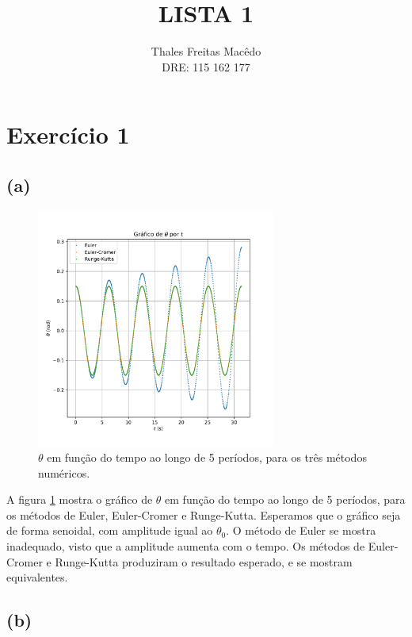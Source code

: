 \documentclass[a4paper, brazil]{article}
\author{Thales Freitas Macêdo \\ DRE: 115 162 177}
\title{LISTA 1}
\begin{document}
\maketitle

\section{Exercício 1}

\subsection{(a)}

\begin{figure}[ht]
\centering
\includegraphics[width=0.7\textwidth]{fig1a.pdf}
\caption{\( \theta \) em função do tempo ao longo de 5 períodos, para os três métodos numéricos.}
\label{fig1a}
\end{figure}

A figura \ref{fig1a} mostra o gráfico de \( \theta \) em função do tempo ao longo de 5 períodos, para os métodos de Euler, Euler-Cromer e Runge-Kutta.
Esperamos que o gráfico seja de forma senoidal, com amplitude igual ao \( \theta_0 \).
O método de Euler se mostra inadequado, visto que a amplitude aumenta com o tempo.
Os métodos de Euler-Cromer e Runge-Kutta produziram o resultado esperado, e se mostram equivalentes.

\newpage
\subsection{(b)}
\end{document}
